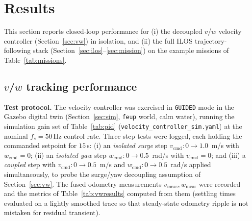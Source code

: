 \section{Results}
\label{sec:results}

\begin{center}
\end{center}

This section reports closed-loop performance for (i) the decoupled $v$/$w$ velocity controller (Section~\ref{sec:vw}) in isolation, and (ii) the full ILOS trajectory-following stack (Section~\ref{sec:ilos}--\ref{sec:mission}) on the example missions of Table~\ref{tab:missions}. 

\subsection{$v$/$w$ tracking performance}

\textbf{Test protocol.} The velocity controller was exercised in \texttt{GUIDED} mode in the Gazebo digital twin (Section~\ref{sec:sim}, \texttt{feup} world, calm water), running the simulation gain set of Table~\ref{tab:pid} (\texttt{velocity\_controller\_sim.yaml}) at the nominal $f_s=50$\,Hz control rate. Three step tests were logged, each holding the commanded setpoint for $15$\,s: (i) an \emph{isolated surge} step $v_{\text{cmd}}:0\to1.0$~m/s with $w_{\text{cmd}}=0$; (ii) an \emph{isolated yaw} step $w_{\text{cmd}}:0\to0.5$~rad/s with $v_{\text{cmd}}=0$; and (iii) a \emph{coupled} step with $v_{\text{cmd}}:0\to0.5$~m/s and $w_{\text{cmd}}:0\to0.5$~rad/s applied simultaneously, to probe the surge/yaw decoupling assumption of Section~\ref{sec:vw}. The fused-odometry measurements $v_{\text{meas}}, w_{\text{meas}}$ were recorded and the metrics of Table~\ref{tab:vwresults} computed from them (settling times evaluated on a lightly smoothed trace so that steady-state odometry ripple is not mistaken for residual transient).

